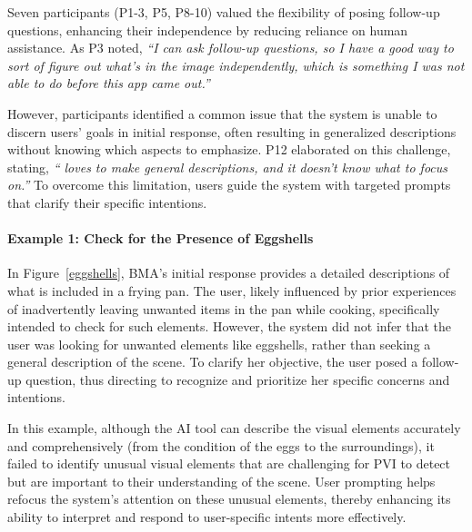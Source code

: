 Seven participants (P1-3, P5, P8-10) valued the flexibility of posing follow-up questions, enhancing their independence by reducing reliance on human assistance. As P3 noted, \textit{``I can ask follow-up questions, so I have a good way to sort of figure out what's in the image independently, which is something I was not able to do before this app came out.''} 


However, participants identified a common issue that the system is unable to discern users' goals in initial response, often resulting in generalized descriptions without knowing which aspects to emphasize. P12 elaborated on this challenge, stating, \textit{``\bma{} loves to make general descriptions, and it doesn't know what to focus on.''} 
To overcome this limitation, users guide the system with targeted prompts that clarify their specific intentions. 





\paragraph{Example 1: Check for the Presence of Eggshells}







In Figure~\ref{eggshells}, BMA's initial response provides a detailed descriptions of what is included in a frying pan. 
The user, likely influenced by prior experiences of inadvertently leaving unwanted items in the pan while cooking, specifically intended to check for such elements. 
% 
However, the system did not infer that the user was looking for unwanted elements like eggshells, rather than seeking a general description of the scene.
% 
To clarify her objective, the user posed a follow-up question, thus directing \sbma{} to recognize and prioritize her specific concerns and intentions. 



In this example, although the AI tool can describe the visual elements accurately and comprehensively (from the condition of the eggs to the surroundings), it failed to identify unusual visual elements that are challenging for PVI to detect but are important to their understanding of the scene. 
% 
User prompting helps refocus the system's attention on these unusual elements, thereby enhancing its ability to interpret and respond to user-specific intents more effectively. 



